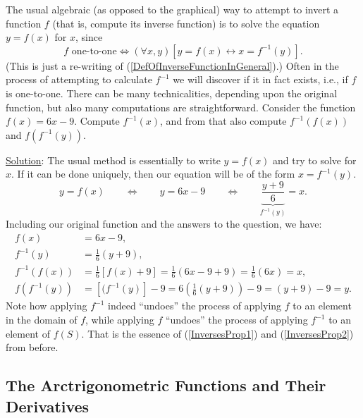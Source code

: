 The usual algebraic (as opposed to the graphical) 
way to attempt to invert a function $f$ (that is, compute
its inverse function) is to solve the equation $y=f(x)$ for $x$, since
$$f\text{ one-to-one} \iff
  (\forall x,y)\left[ y=f(x)\longleftrightarrow x=f^{-1}(y)\right].$$
(This is just a re-writing of (\ref{DefOfInverseFunctionInGeneral}).)
Often in the process of attempting to calculate $f^{-1}$ we
will discover if it in fact exists, i.e., if $f$ is one-to-one.  
There can be many 
technicalities, depending upon the original function, but 
also many computations are straightforward.
\bex
Consider the function $f(x)=6x-9$.  Compute $f^{-1}(x)$,
and from that also compute
$f^{-1}(f(x))$ and $f(f^{-1}(y))$.

\underline{Solution}: The usual method is essentially to write
$y=f(x)$ and try to solve for $x$.  If it can be done uniquely,
then our equation will be of the form $x=f^{-1}(y)$. 
$$
y=f(x)\qquad\iff\qquad y=6x-9\qquad
      \iff\qquad\underbrace{\frac{y+9}6}_{f^{-1}(y)}=x.$$
Including our original function and the answers to the question, we
have:
\begin{align*}
f(x)&=6x-9,\\
f^{-1}(y)&=\frac16(y+9),\\
f^{-1}(f(x))&=\frac16[f(x)+9]=\frac16(6x-9+9)=\frac16(6x)=x,\\
f(f^{-1}(y))&=[(f^{-1}(y)]-9=6\left(\frac16(y+9)\right)-9=
                              (y+9)-9=y.\end{align*}
\eex
Note how applying $f^{-1}$ indeed ``undoes'' the process of applying $f$
to an element in the domain of $f$, while applying $f$ ``undoes'' the
process of applying $f^{-1}$ to an element of $f(S)$.  That is the essence
of (\ref{InversesProp1}) and (\ref{InversesProp2}) from before.








\subsection{The Arctrigonometric Functions and Their Derivatives}


